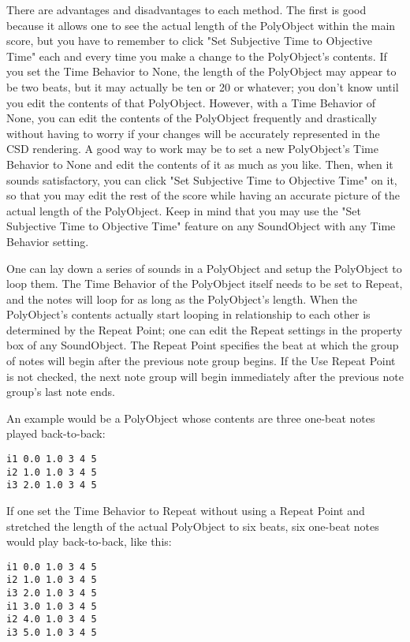 There are advantages and disadvantages to each method. The first is good
because it allows one to see the actual length of the PolyObject within
the main score, but you have to remember to click "Set Subjective Time
to Objective Time" each and every time you make a change to the
PolyObject's contents. If you set the Time Behavior to None, the length
of the PolyObject may appear to be two beats, but it may actually be ten
or 20 or whatever; you don't know until you edit the contents of that
PolyObject. However, with a Time Behavior of None, you can edit the
contents of the PolyObject frequently and drastically without having to
worry if your changes will be accurately represented in the CSD
rendering. A good way to work may be to set a new PolyObject's Time
Behavior to None and edit the contents of it as much as you like. Then,
when it sounds satisfactory, you can click "Set Subjective Time to
Objective Time" on it, so that you may edit the rest of the score while
having an accurate picture of the actual length of the PolyObject. Keep
in mind that you may use the "Set Subjective Time to Objective Time"
feature on any SoundObject with any Time Behavior setting.

One can lay down a series of sounds in a PolyObject and setup the
PolyObject to loop them. The Time Behavior of the PolyObject itself
needs to be set to Repeat, and the notes will loop for as long as the
PolyObject's length. When the PolyObject's contents actually start
looping in relationship to each other is determined by the Repeat Point;
one can edit the Repeat settings in the property box of any SoundObject.
The Repeat Point specifies the beat at which the group of notes will
begin after the previous note group begins. If the Use Repeat Point is
not checked, the next note group will begin immediately after the
previous note group's last note ends.

An example would be a PolyObject whose contents are three one-beat notes
played back-to-back:

\begin{verbatim}
i1 0.0 1.0 3 4 5
i2 1.0 1.0 3 4 5
i3 2.0 1.0 3 4 5
\end{verbatim}

If one set the Time Behavior to Repeat without using a Repeat Point and
stretched the length of the actual PolyObject to six beats, six one-beat
notes would play back-to-back, like this:

\begin{verbatim}
i1 0.0 1.0 3 4 5
i2 1.0 1.0 3 4 5
i3 2.0 1.0 3 4 5
i1 3.0 1.0 3 4 5
i2 4.0 1.0 3 4 5
i3 5.0 1.0 3 4 5
\end{verbatim}

